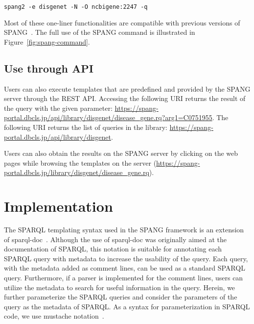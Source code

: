 \documentclass[runningheads]{llncs}
\begin{document}
\texttt{spang2 -e disgenet -N -O ncbigene:2247 -q}

\noindent Most of these one-liner functionalities are compatible with previous versions of SPANG~\cite{spang}. The full use of the SPANG command is illustrated in Figure~\ref{fig:spang-command}.



\subsection{Use through API}


Users can also execute templates that are predefined and provided by the SPANG server through the REST API.
Accessing the following URI returns the result of the query with the given parameter:
\url{https://spang-portal.dbcls.jp/api/library/disgenet/disease_gene.rq?arg1=C0751955}. The following URI returns the list of queries in the library: \url{https://spang-portal.dbcls.jp/api/library/disgenet}.


Users can also obtain the results on the SPANG server by clicking on the web pages while browsing the templates on the server (\url{https://spang-portal.dbcls.jp/library/disgenet/disease_gene.rq}). 



\section{Implementation}

The SPARQL templating syntax used in the SPANG framework is an extension of sparql-doc~\cite{sparql-doc}. Although the use of sparql-doc was originally aimed at the documentation of SPARQL, this notation is suitable for annotating each SPARQL query with metadata to increase the usability of the query. Each query, with the metadata added as comment lines, can be used as a standard SPARQL query. Furthermore, if a parser is implemented for the comment lines, users can utilize the metadata to search for useful information in the query.
Herein, we further parameterize the SPARQL queries and consider the parameters of the query as the metadata of SPARQL.
As a syntax for parameterization in SPARQL code, we use mustache notation~\cite{mustache}.
\end{document}
